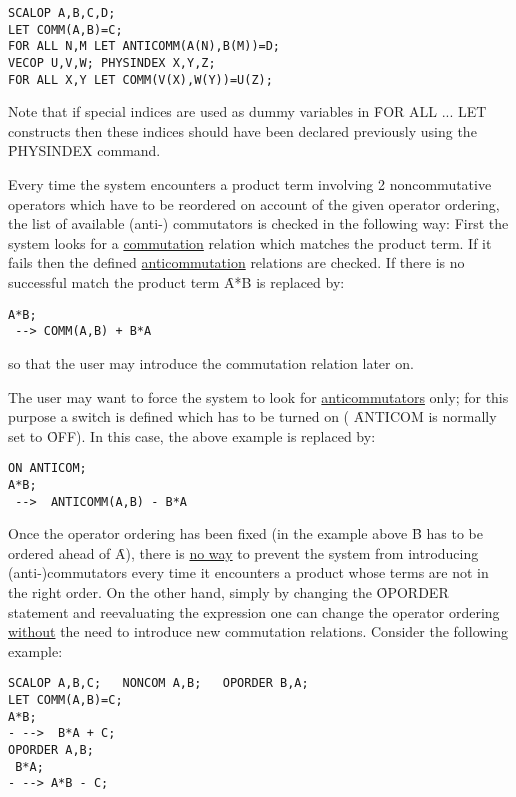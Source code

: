 \begin{verbatim}
SCALOP A,B,C,D;
LET COMM(A,B)=C;
FOR ALL N,M LET ANTICOMM(A(N),B(M))=D;
VECOP U,V,W; PHYSINDEX X,Y,Z;
FOR ALL X,Y LET COMM(V(X),W(Y))=U(Z);
\end{verbatim}

Note that if special indices are used as dummy variables in
\f{FOR ALL ... LET} constructs then these indices should  have been
declared previously using the \f{PHYSINDEX} command.

Every time the system
encounters a product term involving 2
noncommutative operators which have to be reordered on account of the
given operator ordering, the list of available (anti-) commutators is
checked in the following way: First the system looks for a
\underline{commutation} relation which matches the  product term. If it
fails then the defined \underline{anticommutation} relations are
checked. If there is no successful match the product term
 \f{A*B} is replaced by: \\

\begin{verbatim}
A*B;
 --> COMM(A,B) + B*A
\end{verbatim}
so that the user may introduce the commutation relation later on.

The user may want to force the system to look for
\underline{anticommutators} only; for this purpose a switch 
is defined which has to be turned on ( \f{ANTICOM} is normally set to
\f{OFF}). In this case, the above example is replaced by: \\

\begin{verbatim}
ON ANTICOM;
A*B;
 -->  ANTICOMM(A,B) - B*A
\end{verbatim}

Once the operator ordering has been fixed (in the example above \f{B}
has to be ordered ahead of \f{A}),
there is \underline{no way} to prevent the
system from introducing (anti-)commutators  every time it encounters
a product whose terms are not in the right order. On the other hand,
simply by changing the \f{OPORDER} statement  and reevaluating the
expression one can change  the operator ordering
\underline{without}
the need to introduce new commutation relations.
Consider the following example: \\

\begin{verbatim}
SCALOP A,B,C;   NONCOM A,B;   OPORDER B,A;
LET COMM(A,B)=C;
A*B;
- -->  B*A + C;
OPORDER A,B;
 B*A;
- --> A*B - C;
\end{verbatim}

